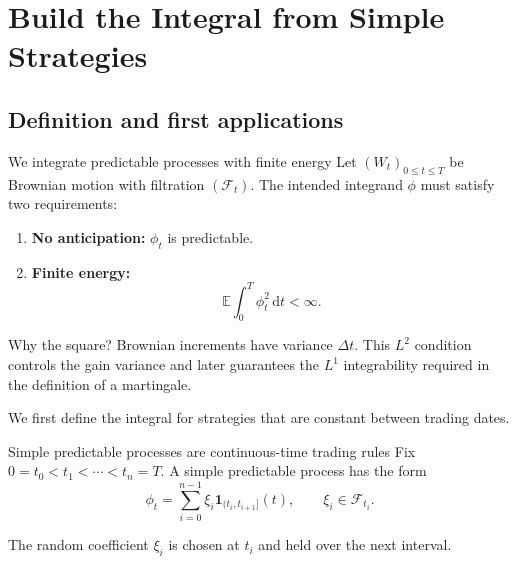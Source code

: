 \documentclass[10pt,aspectratio=169]{beamer}
\newcommand{\E}{\mathbb E}
\newcommand{\F}{\mathcal F}
\newcommand{\dd}{\,\mathrm d}
\begin{document}
\section{Build the Integral from Simple Strategies}
\subsection{Definition and first applications}

\begin{frame}{We integrate predictable processes with finite energy}
Let \((W_t)_{0\le t\le T}\) be Brownian motion with filtration \((\F_t)\).
The intended integrand \(\phi\) must satisfy two requirements:
\begin{enumerate}\setlength{\itemsep}{0.75em}
  \item \textbf{No anticipation:} \(\phi_t\) is predictable.
  \item \textbf{Finite energy:}
  \[
  \E\int_0^T\phi_t^2\dd t<\infty.
  \]
\end{enumerate}
\begin{block}{Why the square?}
Brownian increments have variance \(\Delta t\). This \(L^2\) condition controls the gain variance and later guarantees the \(L^1\) integrability required in the definition of a martingale.
\end{block}
We first define the integral for strategies that are constant between trading dates.
\end{frame}

\begin{frame}{Simple predictable processes are continuous-time trading rules}
Fix \(0=t_0<t_1<\cdots<t_n=T\). A simple predictable process has the form
\[
\phi_t=\sum_{i=0}^{n-1}\xi_i\mathbf 1_{(t_i,t_{i+1}]}(t),
\qquad \xi_i\in\F_{t_i}.
\]
\begin{center}
\end{center}
The random coefficient \(\xi_i\) is chosen at \(t_i\) and held over the next interval.
\end{frame}
\end{document}
